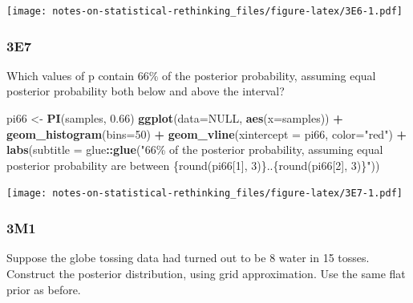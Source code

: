 \documentclass[
]{book}
\newenvironment{Shaded}{\begin{snugshade}}{\end{snugshade}}
\newcommand{\DataTypeTok}[1]{\textcolor[rgb]{0.13,0.29,0.53}{#1}}
\newcommand{\DecValTok}[1]{\textcolor[rgb]{0.00,0.00,0.81}{#1}}
\newcommand{\FloatTok}[1]{\textcolor[rgb]{0.00,0.00,0.81}{#1}}
\newcommand{\KeywordTok}[1]{\textcolor[rgb]{0.13,0.29,0.53}{\textbf{#1}}}
\newcommand{\NormalTok}[1]{#1}
\newcommand{\OperatorTok}[1]{\textcolor[rgb]{0.81,0.36,0.00}{\textbf{#1}}}
\newcommand{\OtherTok}[1]{\textcolor[rgb]{0.56,0.35,0.01}{#1}}
\newcommand{\StringTok}[1]{\textcolor[rgb]{0.31,0.60,0.02}{#1}}
\begin{document}
\texttt{[image: notes-on-statistical-rethinking\_files/figure-latex/3E6-1.pdf]}

\hypertarget{e7}{%
\subsubsection*{3E7}\label{e7}}

Which values of p contain 66\% of the posterior probability, assuming equal posterior probability both below and above the interval?

\begin{Shaded}
\begin{Highlighting}[]
\NormalTok{pi66 \textless{}{-}}\StringTok{ }\KeywordTok{PI}\NormalTok{(samples, }\FloatTok{0.66}\NormalTok{)}
\KeywordTok{ggplot}\NormalTok{(}\DataTypeTok{data=}\OtherTok{NULL}\NormalTok{, }\KeywordTok{aes}\NormalTok{(}\DataTypeTok{x=}\NormalTok{samples)) }\OperatorTok{+}\StringTok{ }
\StringTok{  }\KeywordTok{geom\_histogram}\NormalTok{(}\DataTypeTok{bins=}\DecValTok{50}\NormalTok{) }\OperatorTok{+}\StringTok{ }
\StringTok{  }\KeywordTok{geom\_vline}\NormalTok{(}\DataTypeTok{xintercept =}\NormalTok{ pi66, }\DataTypeTok{color=}\StringTok{"red"}\NormalTok{) }\OperatorTok{+}\StringTok{ }
\StringTok{  }\KeywordTok{labs}\NormalTok{(}\DataTypeTok{subtitle =}\NormalTok{ glue}\OperatorTok{::}\KeywordTok{glue}\NormalTok{(}\StringTok{"66\% of the posterior probability, assuming equal posterior probability are between \{round(pi66[1], 3)\}..\{round(pi66[2], 3)\}"}\NormalTok{))}
\end{Highlighting}
\end{Shaded}

\texttt{[image: notes-on-statistical-rethinking\_files/figure-latex/3E7-1.pdf]}

\hypertarget{m1-1}{%
\subsubsection*{3M1}\label{m1-1}}

Suppose the globe tossing data had turned out to be 8 water in 15 tosses. Construct the posterior distribution, using grid approximation. Use the same flat prior as before.
\end{document}
